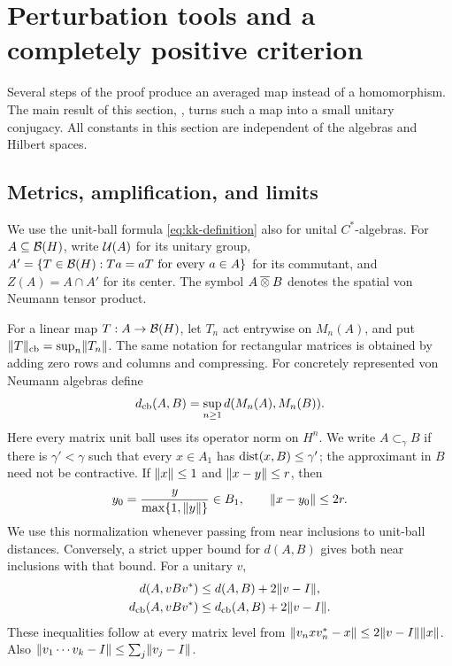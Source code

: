 \section{Perturbation tools and a completely positive criterion}
\label{sec:foundations}

Several steps of the proof produce an averaged map instead of a
homomorphism. The main result of this section, , turns
such a map into a small unitary conjugacy. All constants in this section
are independent of the algebras and Hilbert spaces.

\subsection{Metrics, amplification, and limits}

We use the unit-ball formula \eqref{eq:kk-definition} also for unital
$C^*$-algebras. For $A\subseteq\mathcal B(H)$, write $\mathcal U(A)$ for its unitary
group, $A'=\{T\in\mathcal B(H):Ta=aT\text{ for every }a\in A\}$ for its
commutant, and $Z(A)=A\cap A'$ for its center. The symbol
$A\mathbin{\overline\otimes} B$ denotes the spatial von Neumann tensor product.

For a linear map $T:A\to\mathcal B(H)$, let $T_n$ act entrywise on $M_n(A)$,
and put $\lVert T\rVert_{\mathrm{cb}}=\sup_n\lVert T_n\rVert$.
The same notation for rectangular matrices is obtained by adding zero
rows and columns and compressing. For concretely represented von Neumann
algebras define
\[
 d_{\mathrm{cb}}(A,B)=\sup_{n\ge1}d(M_n(A),M_n(B)).
\]
Here every matrix unit ball uses its operator norm on $H^n$.
We write $A\subset_\gamma B$ if there is $\gamma'<\gamma$ such that
every $x\in A_1$ has $\operatorname{dist}(x,B)\le\gamma'$; the approximant in $B$
need not be contractive. If $\lVert x\rVert\le1$ and $\lVert x-y\rVert\le r$, then
\[
 y_0=\frac{y}{\max\{1,\lVert y\rVert\}}\in B_1,
 \qquad \lVert x-y_0\rVert\le2r.
\]
We use this normalization whenever passing from near inclusions to
unit-ball distances. Conversely, a strict upper bound for $d(A,B)$
gives both near inclusions with that bound. For a unitary $v$,
\begin{equation}\label{eq:gap-adjustment}
 \begin{aligned}
 d(A,vBv^*)&\le d(A,B)+2\lVert v-I\rVert,\\
 d_{\mathrm{cb}}(A,vBv^*)&\le d_{\mathrm{cb}}(A,B)+2\lVert v-I\rVert.
 \end{aligned}
\end{equation}
These inequalities follow at every matrix level from
$\lVert v_n x v_n^*-x\rVert\le2\lVert v-I\rVert\lVert x\rVert$.
Also $\lVert v_1\cdots v_k-I\rVert\le\sum_j\lVert v_j-I\rVert$.

